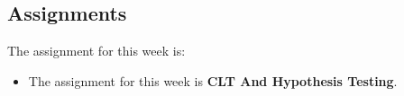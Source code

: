 \subsection{Assignments}

The assignment for this week is:

\begin{itemize}
    \item The assignment for this week is \textbf{CLT And Hypothesis Testing}. 
\end{itemize}
